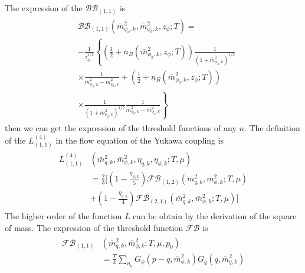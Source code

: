 \documentclass[%
reprint,
superscriptaddress,
showpacs,preprintnumbers,
 amsmath,amssymb,
 aps,
prd,
]{revtex4-1}
\begin{document}
The expression of the $\mathcal{BB}_{(1,1)}$ is 
\begin{align}
\begin{split}
&\mathcal{BB}_{(1,1)}(\bar{m}^{2}_{\phi_a,k},\bar{m}^{2}_{\phi_b,k},z_\phi;T)=\\&-\frac{1}{z^{1/2}_{\phi}}\left\{ \left( 
\frac{1}{2}+n_B(\bar{m}^{2}_{\phi_a,k},z_\phi;T) \right)\frac{1}{(1+\bar{m}^{2}_{\phi_a,k})^{1/2}} \right. \\
&\left.\times \frac{1}{\bar{m}^{2}_{\phi_a,k}-\bar{m}^{2}_{\phi_b,k}}+\left( \frac{1}{2}+n_B(\bar{m}^{2}_{\phi_b,k},z_\phi;T) 
\right)\right. \\
&\left.\times \frac{1}{(1+\bar{m}^{2}_{\phi_b,k})^{1/2}}\frac{1}{\bar{m}^{2}_{\phi_b,k}-\bar{m}^{2}_{\phi_a,k}}\right\}
\end{split}
\end{align} 
then we can get the expression of the threshold functions of any $n$.
The definition of the $L^{(4)}_{(1,1)}$ in the flow equation of the Yukawa coupling is
\begin{align}
\begin{split}
L^{(4)}_{(1,1)}&(\bar{m}^{2}_{q,k},\bar{m}^{2}_{\phi,k},\eta_{q,k},\eta_{\phi,k};T,\mu)\\
&=\frac{2}{3}\bigg[(1-\frac{\eta_{\phi,k}}{5})\mathcal{FB}_{(1,2)}(\bar{m}^{2}_{q,k},\bar{m}^{2}_{\phi,k};T,\mu)\\
&+(1-\frac{\eta_{q,k}}{4})\mathcal{FB}_{(2,1)}(\bar{m}^{2}_{q,k},\bar{m}^{2}_{\phi,k};T,\mu)\bigg]
\end{split}
\end{align} 
The higher order of the function $L$ can be obtain by the derivation of the square of mass. The expression of the threshold function $\mathcal{FB}$  
is
\begin{align}
\begin{split}
\mathcal{FB}_{(1,1)}&(\bar{m}^{2}_{q,k},\bar{m}^{2}_{\phi,k};T,\mu,p_0)\\
&=\frac{T}{k}\sum_{n_q}G_{\phi}(p-q,\bar{m}^{2}_{\phi,k})G_q(q,\bar{m}^{2}_{q,k})
\end{split}
\end{align} 

\end{document}
